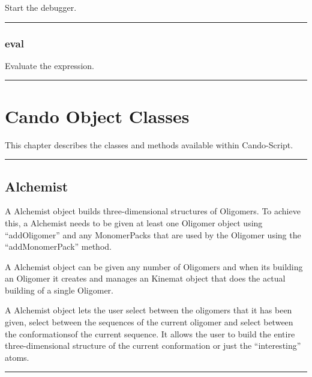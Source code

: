 \begin{itemize}
  Start the debugger.

\rule{6in}{0.01cm}\par
{}\par
\subsection{eval}

  Evaluate the expression.

\rule{6in}{0.01cm}\par
{}\par
\chapter{Cando Object Classes}

This chapter describes the classes and methods available within Cando-Script.

\rule{6in}{0.01cm}\par
{}\par
\section{Alchemist}

  A Alchemist object builds three-dimensional structures of Oligomers. To achieve this, a Alchemist needs to be given at least one Oligomer object using ``addOligomer'' and any MonomerPacks that are used by the Oligomer using the ``addMonomerPack'' method.

  A Alchemist object can be given any number of Oligomers and when its building an Oligomer it creates and manages an Kinemat object that does the actual building of a single Oligomer.

  A Alchemist object lets the user select between the oligomers that it has been given, select between the sequences of the current oligomer and select between the conformationsof the current sequence. It allows the user to build the entire three-dimensional structure of the current conformation or just the ``interesting'' atoms.

\rule{6in}{0.01cm}\par
{}\par

\end{itemize}
